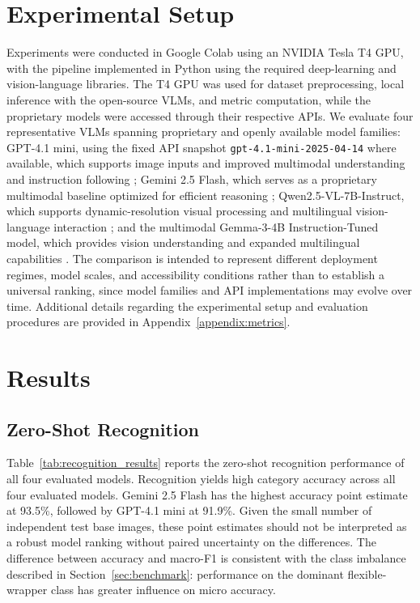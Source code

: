 \documentclass{article}
\begin{document}
\section{Experimental Setup}
\label{sec:experimental_setup}
Experiments were conducted in Google Colab using an NVIDIA Tesla T4 GPU, with the pipeline implemented in Python using the required deep-learning and vision-language libraries. The T4 GPU was used for dataset preprocessing, local inference with the open-source VLMs, and metric computation, while the proprietary models were accessed through their respective APIs. We evaluate four representative VLMs spanning proprietary and openly available model families: GPT-4.1 mini, using the fixed API snapshot \texttt{gpt-4.1-mini-2025-04-14} where available, which supports image inputs and improved multimodal understanding and instruction following \citep{openai2025gpt41}; Gemini 2.5 Flash, which serves as a proprietary multimodal baseline optimized for efficient reasoning \citep{google2025gemini25flash}; Qwen2.5-VL-7B-Instruct, which supports dynamic-resolution visual processing and multilingual vision-language interaction \citep{bai2025qwen25vl}; and the multimodal Gemma-3-4B Instruction-Tuned model, which provides vision understanding and expanded multilingual capabilities \citep{gemmateam2025gemma3}. The comparison is intended to represent different deployment regimes, model scales, and accessibility conditions rather than to establish a universal ranking, since model families and API implementations may evolve over time. Additional details regarding the experimental setup and evaluation procedures are provided in Appendix~\ref{appendix:metrics}.



\section{Results}
\label{sec:results}


\subsection{Zero-Shot Recognition}
\label{subsec:recognition_results}

Table~\ref{tab:recognition_results} reports the zero-shot recognition performance of all four evaluated models.
Recognition yields high category accuracy across all four evaluated models. Gemini 2.5 Flash has the highest accuracy point estimate at 93.5\%, followed by GPT-4.1 mini at 91.9\%. Given the small number of independent test base images, these point estimates should not be interpreted as a robust model ranking without paired uncertainty on the differences. The difference between accuracy and macro-F1 is consistent with the class imbalance described in Section~\ref{sec:benchmark}: performance on the dominant flexible-wrapper class has greater influence on micro accuracy.
\end{document}
